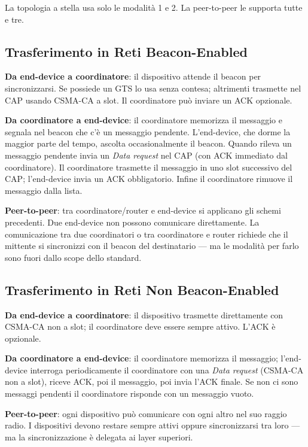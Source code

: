 \documentclass[
  italian,
  openany]{book}
\begin{document}
La topologia a stella usa solo le modalità 1 e 2. La peer-to-peer le
supporta tutte e tre.

\subsection{Trasferimento in Reti
Beacon-Enabled}\label{trasferimento-in-reti-beacon-enabled}

\textbf{Da end-device a coordinatore}: il dispositivo attende il beacon
per sincronizzarsi. Se possiede un GTS lo usa senza contesa; altrimenti
trasmette nel CAP usando CSMA-CA a slot. Il coordinatore può inviare un
ACK opzionale.

\textbf{Da coordinatore a end-device}: il coordinatore memorizza il
messaggio e segnala nel beacon che c'è un messaggio pendente.
L'end-device, che dorme la maggior parte del tempo, ascolta
occasionalmente il beacon. Quando rileva un messaggio pendente invia un
\emph{Data request} nel CAP (con ACK immediato dal coordinatore). Il
coordinatore trasmette il messaggio in uno slot successivo del CAP;
l'end-device invia un ACK obbligatorio. Infine il coordinatore rimuove
il messaggio dalla lista.

\textbf{Peer-to-peer}: tra coordinatore/router e end-device si applicano
gli schemi precedenti. Due end-device non possono comunicare
direttamente. La comunicazione tra due coordinatori o tra coordinatore e
router richiede che il mittente si sincronizzi con il beacon del
destinatario --- ma le modalità per farlo sono fuori dallo scope dello
standard.

\subsection{Trasferimento in Reti Non
Beacon-Enabled}\label{trasferimento-in-reti-non-beacon-enabled}

\textbf{Da end-device a coordinatore}: il dispositivo trasmette
direttamente con CSMA-CA non a slot; il coordinatore deve essere sempre
attivo. L'ACK è opzionale.

\textbf{Da coordinatore a end-device}: il coordinatore memorizza il
messaggio; l'end-device interroga periodicamente il coordinatore con una
\emph{Data request} (CSMA-CA non a slot), riceve ACK, poi il messaggio,
poi invia l'ACK finale. Se non ci sono messaggi pendenti il coordinatore
risponde con un messaggio vuoto.

\textbf{Peer-to-peer}: ogni dispositivo può comunicare con ogni altro
nel suo raggio radio. I dispositivi devono restare sempre attivi oppure
sincronizzarsi tra loro --- ma la sincronizzazione è delegata ai layer
superiori.
\end{document}
